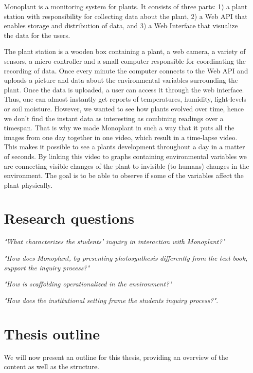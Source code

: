 Monoplant is a monitoring system for plants. It consists of three parts: 1) a plant station with responsibility for collecting data about the plant, 2) a Web API that enables storage and distribution of data, and 3) a Web Interface that visualize the data for the users. 

The plant station is a wooden box containing a plant, a web camera, a variety of sensors, a micro controller and a small computer responsible for coordinating the recording of data. Once every minute the computer connects to the Web API and uploads a picture and data about the environmental variables surrounding the plant. Once the data is uploaded, a user can access it through the web interface. Thus, one can almost instantly get reports of temperatures, humidity, light-levels or soil moisture. However, we wanted to see how plants evolved over time, hence we don't find the instant data as interesting as combining readings over a timespan. That is why we made Monoplant in such a way that it puts all the images from one day together in one video, which result in a time-lapse video. This makes it possible to see a plants development throughout a day in a matter of seconds. By linking this video to graphs containing environmental variables we are connecting visible changes of the plant to invisible (to humans) changes in the environment. The goal is to be able to observe if some of the variables affect the plant physically. 


\section{Research questions}

\emph{"What characterizes the students’ inquiry in interaction with Monoplant?"}

\emph{"How does Monoplant, by presenting photosynthesis differently from the text book, support the inquiry process?"}

\emph{"How is scaffolding operationalized in the environment?"}

\emph{"How does the institutional setting frame the students inquiry process?"}.

\section{Thesis outline}
We will now present an outline for this thesis, providing an overview of the content as well as the structure. 


